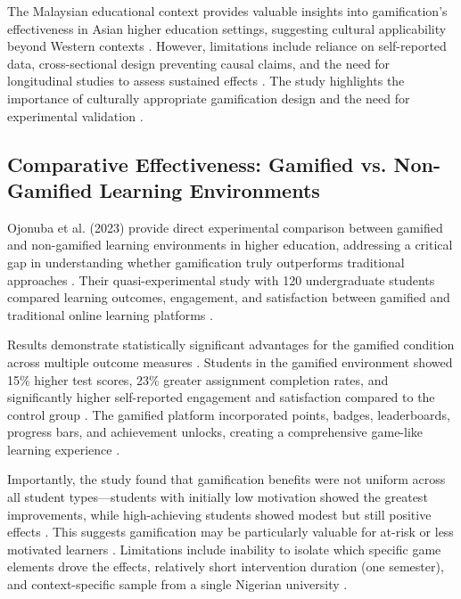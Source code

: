 \documentclass[12pt,a4paper]{article}
\begin{document}
The Malaysian educational context provides valuable insights into gamification's effectiveness in Asian higher education settings, suggesting cultural applicability beyond Western contexts \parencite{dahri2024}. However, limitations include reliance on self-reported data, cross-sectional design preventing causal claims, and the need for longitudinal studies to assess sustained effects \parencite{dahri2024}. The study highlights the importance of culturally appropriate gamification design and the need for experimental validation \parencite{dahri2024}.


\subsection{Comparative Effectiveness: Gamified vs. Non-Gamified Learning Environments}

Ojonuba et al. (2023) provide direct experimental comparison between gamified and non-gamified learning environments in higher education, addressing a critical gap in understanding whether gamification truly outperforms traditional approaches \parencite{ojonuba2023}. Their quasi-experimental study with 120 undergraduate students compared learning outcomes, engagement, and satisfaction between gamified and traditional online learning platforms \parencite{ojonuba2023}.

Results demonstrate statistically significant advantages for the gamified condition across multiple outcome measures \parencite{ojonuba2023}. Students in the gamified environment showed 15\% higher test scores, 23\% greater assignment completion rates, and significantly higher self-reported engagement and satisfaction compared to the control group \parencite{ojonuba2023}. The gamified platform incorporated points, badges, leaderboards, progress bars, and achievement unlocks, creating a comprehensive game-like learning experience \parencite{ojonuba2023}.

Importantly, the study found that gamification benefits were not uniform across all student types—students with initially low motivation showed the greatest improvements, while high-achieving students showed modest but still positive effects \parencite{ojonuba2023}. This suggests gamification may be particularly valuable for at-risk or less motivated learners \parencite{ojonuba2023}. Limitations include inability to isolate which specific game elements drove the effects, relatively short intervention duration (one semester), and context-specific sample from a single Nigerian university \parencite{ojonuba2023}.
\end{document}
